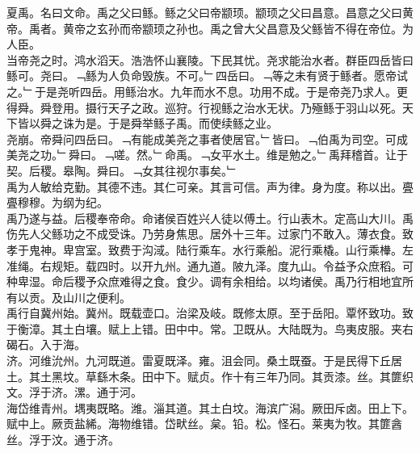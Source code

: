 \documentclass{zhvt-classic}
\begin{document}





\hspace*{2em}夏禹。名曰文命。禹之父曰鲧。鲧之父曰帝颛顼。颛顼之父曰昌意。昌意之父曰黄帝。禹者。黄帝之玄孙而帝颛顼之孙也。禹之曾大父昌意及父鲧皆不得在帝位。为人臣。\\
\hspace*{2em}当帝尧之时。鸿水滔天。浩浩怀山襄陵。下民其忧。尧求能治水者。群臣四岳皆曰鲧可。尧曰。﹁鲧为人负命毁族。不可。﹂四岳曰。﹁等之未有贤于鲧者。愿帝试之。﹂于是尧听四岳。用鲧治水。九年而水不息。功用不成。于是帝尧乃求人。更得舜。舜登用。摄行天子之政。巡狩。行视鲧之治水无状。乃殛鲧于羽山以死。天下皆以舜之诛为是。于是舜举鲧子禹。而使续鲧之业。\\
\hspace*{2em}尧崩。帝舜问四岳曰。﹁有能成美尧之事者使居官。﹂皆曰。﹁伯禹为司空。可成美尧之功。﹂舜曰。﹁嗟。然。﹂命禹。﹁女平水土。维是勉之。﹂禹拜稽首。让于契。后稷。皋陶。舜曰。﹁女其往视尔事矣。﹂\\
\hspace*{2em}禹为人敏给克勤。其德不违。其仁可亲。其言可信。声为律。身为度。称以出。亹亹穆穆。为纲为纪。\\
\hspace*{2em}禹乃遂与益。后稷奉帝命。命诸侯百姓兴人徒以傅土。行山表木。定高山大川。禹伤先人父鲧功之不成受诛。乃劳身焦思。居外十三年。过家门不敢入。薄衣食。致孝于鬼神。卑宫室。致费于沟淢。陆行乘车。水行乘船。泥行乘橇。山行乘檋。左准绳。右规矩。载四时。以开九州。通九道。陂九泽。度九山。令益予众庶稻。可种卑湿。命后稷予众庶难得之食。食少。调有余相给。以均诸侯。禹乃行相地宜所有以贡。及山川之便利。\\
\hspace*{2em}禹行自冀州始。冀州。既载壶口。治梁及岐。既修太原。至于岳阳。覃怀致功。致于衡漳。其土白壤。赋上上错。田中中。常。卫既从。大陆既为。鸟夷皮服。夹右碣石。入于海。\\
\hspace*{2em}济。河维沇州。九河既道。雷夏既泽。雍。沮会同。桑土既蚕。于是民得下丘居土。其土黑坟。草繇木条。田中下。赋贞。作十有三年乃同。其贡漆。丝。其篚织文。浮于济。漯。通于河。\\
\hspace*{2em}海岱维青州。堣夷既略。潍。淄其道。其土白坟。海滨广潟。厥田斥卤。田上下。赋中上。厥贡盐絺。海物维错。岱畎丝。枲。铅。松。怪石。莱夷为牧。其篚酓丝。浮于汶。通于济。\\
\end{document}
